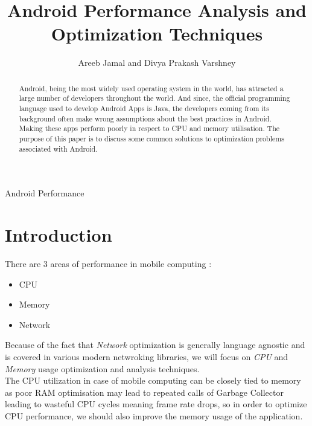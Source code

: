\documentclass[journal]{IEEEtran}
\begin{document}
\title{Android Performance Analysis and \\ Optimization Techniques}

\author{Areeb Jamal and Divya Prakash Varshney \\
	 }

%
{Android Performance}


\maketitle


\begin{abstract}
Android, being the most widely used operating system in the world, has attracted a large number of developers throughout the world. And since, the official programming language used to develop Android Apps is Java, the developers coming from its background often make wrong assumptions about the best practices in Android. Making these apps perform poorly in respect to CPU and memory utilisation. The purpose of this paper is to discuss some common solutions to optimization problems associated with Android.
\end{abstract}


\section{Introduction}
There are 3 areas of performance in mobile computing :
\begin{itemize}
	\item CPU
	\item Memory
	\item Network
\end{itemize}
Because of the fact that \emph{Network} optimization is generally language agnostic and is covered in various modern netwroking libraries, we will focus on \emph{CPU} and \emph{Memory} usage optimization and analysis techniques.\\
The CPU utilization in case of mobile computing can be closely tied to memory as poor RAM optimisation may lead to repeated calls of Garbage Collector leading to wasteful CPU cycles meaning frame rate drops, so in order to optimize CPU performance, we should also improve the memory usage of the application.
\end{document}
